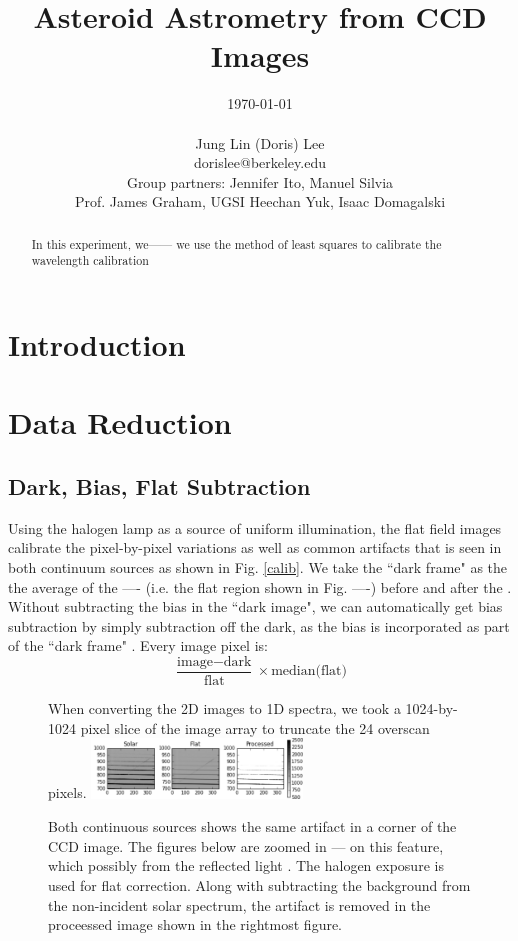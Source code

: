 \documentclass[authoryear, 12pt,5p, times]{elsarticle}
\begin{document}
\begin{frontmatter}
\title{Asteroid Astrometry from CCD Images}
\author{\today \\ \quad \\Jung Lin (Doris) Lee\\ dorislee@berkeley.edu\\Group partners: Jennifer Ito, Manuel Silvia\\Prof. James Graham, UGSI Heechan Yuk, Isaac Domagalski}
	\begin{abstract}
In this experiment,  we------
we use the method of least squares to calibrate the wavelength calibration 
	\end{abstract}
\end{frontmatter}
\section{Introduction}
\section{Data Reduction}
\subsection{Dark, Bias, Flat Subtraction}
\label{subtraction}
Using the halogen lamp as a source of uniform illumination, the flat field images calibrate the pixel-by-pixel variations as well as common artifacts that is seen in both continuum sources as shown in Fig. \ref{calib}. We take the ``dark frame" as the the average of the ---- (i.e. the flat region shown in Fig. ----) before and after the  . Without subtracting the bias in the ``dark image", we can automatically get bias subtraction by simply subtraction off the dark, as the bias is incorporated as part of the ``dark frame" .
Every image pixel is:
\begin{equation}
			\frac{\text{image}-\text{dark}}{\text{flat}}\times\text{median(flat)}
			\label{calib_eq}
\end{equation}
 \begin{figure}[h!]
 When converting the 2D images to 1D spectra, we took a 1024-by-1024 pixel slice of the image array to truncate the 24 overscan pixels.
\includegraphics[width=0.5\textwidth]{figures/processed}
\caption{Both continuous sources shows the same artifact in a corner of the CCD image. The figures below are zoomed in --- on this feature, which  possibly from the reflected light . The halogen exposure is used for flat correction. Along with subtracting the background from the non-incident solar spectrum, the artifact is removed in the proceessed image shown in the rightmost figure.}
\label{processed}
\end{figure}
\end{document}

